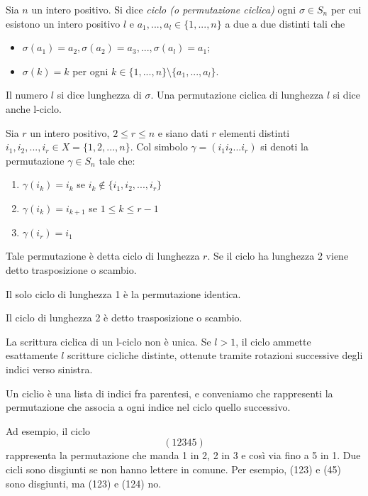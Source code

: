 \begin{definizione}
Sia $n$ un intero positivo. Si dice \textit{ciclo (o permutazione ciclica)} ogni $\sigma \in S_n$ per cui esistono un intero
positivo $l$ e $a_1, ..., a_l \in \{1, ..., n\}$ a due a due distinti tali che
\begin{itemize}
 \item $\sigma(a_1)=a_2, \sigma(a_2)=a_3, ..., \sigma(a_l)=a_1$;
 \item $\sigma(k)=k$ per ogni $k \in \{1, ..., n\} \setminus \{a_1, ..., a_l\}$.
\end{itemize}
\end{definizione}

Il numero $l$ si dice lunghezza di $\sigma$. Una permutazione ciclica di lunghezza $l$ si dice anche l-ciclo.

\begin{definizione}
Sia $r$ un intero positivo, $2 \leq r \leq n $ e siano dati $r$ elementi distinti $i_1, i_2, ..., i_r \in X=\{1,2,...,n\}$.
Col simbolo $\gamma = (i_1 i_2 ... i_r)$ si denoti la permutazione $\gamma \in S_n$ tale che:
\begin{enumerate}
 \item $\gamma (i_k) = i_k$ se $i_k \notin \{i_1, i_2, ..., i_r\}$
 \item $\gamma(i_k)=i_{k+1}$ se $1 \leq k \leq r-1$
 \item $\gamma (i_r)=i_1$
\end{enumerate}
\end{definizione}
Tale permutazione è detta ciclo di lunghezza $r$.
Se il ciclo ha lunghezza 2 viene detto trasposizione o scambio.

Il solo ciclo di lunghezza 1 è la permutazione identica.

Il ciclo di lunghezza 2 è detto trasposizione o scambio.

La scrittura ciclica di un l-ciclo non è unica. Se $l>1$, il ciclo ammette esattamente $l$ scritture cicliche distinte,
ottenute tramite rotazioni successive degli indici verso sinistra.

Un ciclio è una lista di indici fra parentesi, e conveniamo che rappresenti la permutazione che associa a ogni indice nel ciclo
quello successivo.

\medskip
Ad esempio, il ciclo
\[
 (12345)
\]
rappresenta la permutazione che manda 1 in 2, 2 in 3 e così via fino a 5 in 1. Due cicli sono disgiunti se non hanno lettere in comune.
Per esempio, (123) e (45) sono disgiunti, ma (123) e (124) no. 

